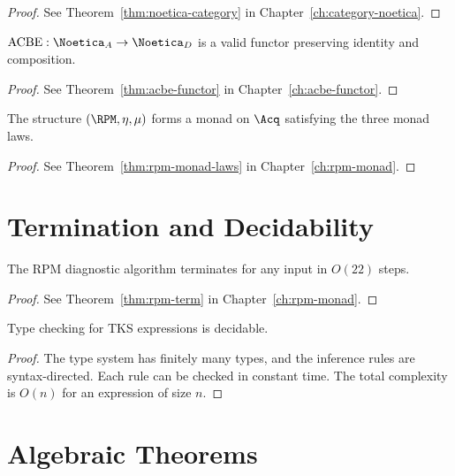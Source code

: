 \begin{proof}
See Theorem~\ref{thm:noetica-category} in Chapter~\ref{ch:category-noetica}.
\end{proof}

\begin{theorem}
\label{thm:acbe-func-formal}
$\mathrm{ACBE} : \Noetica_A \to \Noetica_D$ is a valid functor preserving identity and composition.
\end{theorem}

\begin{proof}
See Theorem~\ref{thm:acbe-functor} in Chapter~\ref{ch:acbe-functor}.
\end{proof}

\begin{theorem}
\label{thm:rpm-monad-formal}
The structure $(\RPM, \eta, \mu)$ forms a monad on $\Acq$ satisfying the three monad laws.
\end{theorem}

\begin{proof}
See Theorem~\ref{thm:rpm-monad-laws} in Chapter~\ref{ch:rpm-monad}.
\end{proof}

\section{Termination and Decidability}

\begin{theorem}
\label{thm:rpm-term-formal}
The RPM diagnostic algorithm terminates for any input in $O(22)$ steps.
\end{theorem}

\begin{proof}
See Theorem~\ref{thm:rpm-term} in Chapter~\ref{ch:rpm-monad}.
\end{proof}

\begin{theorem}
\label{thm:typecheck-decide}
Type checking for TKS expressions is decidable.
\end{theorem}

\begin{proof}
The type system has finitely many types, and the inference rules are syntax-directed. Each rule can be checked in constant time. The total complexity is $O(n)$ for an expression of size $n$.
\end{proof}

\section{Algebraic Theorems}

